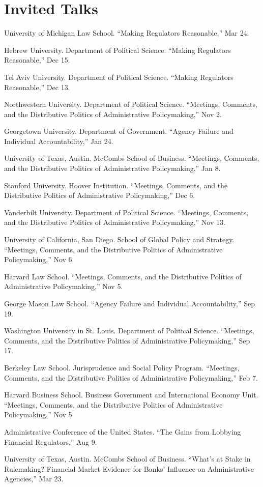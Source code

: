 \documentclass[12pt,letterpaper]{report}
\newcommand{\talk}[4]{\item[#1]{\tab{}#3. \enquote{#2,} #4.}} %
\begin{document}
    \section*{Invited Talks}

    \begin{tablist}
	\talk{2022}{Making Regulators Reasonable}{University of Michigan Law School}{Mar 24}
	
    \talk{2021}{Making Regulators Reasonable}{Hebrew University. Department of Political Science}{Dec 15}
    	
	\talk{2021}{Making Regulators Reasonable}{Tel Aviv University. Department of Political Science}{Dec 13}
			
	\talk{2021}{Meetings, Comments, and the Distributive Politics of Administrative Policymaking}{Northwestern University. Department of Political Science}{Nov 2}
		
    \talk{2020}{Agency Failure and Individual Accountability}{Georgetown University. Department of Government}{Jan 24}
    \talk{2020}{Meetings, Comments, and the Distributive Politics of Administrative Policymaking}{University of Texas, Austin. McCombs School of Business}{Jan 8}
    \talk{2019}{Meetings, Comments, and the Distributive Politics of Administrative Policymaking}{Stanford University. Hoover Institution}{Dec 6}
    \talk{2019}{Meetings, Comments, and the Distributive Politics of Administrative Policymaking}{Vanderbilt University. Department of Political Science}{Nov 13}
    \talk{2019}{Meetings, Comments, and the Distributive Politics of Administrative Policymaking}{University of California, San Diego. School of Global Policy and Strategy}{Nov 6}
    \talk{2019}{Meetings, Comments, and the Distributive Politics of Administrative Policymaking}{Harvard Law School}{Nov 5}    
    \talk{2019}{Agency Failure and Individual Accountability}{George Mason Law School}{Sep 19}
    \talk{2019}{Meetings, Comments, and the Distributive Politics of Administrative Policymaking}{Washington University in St. Louis. Department of Political Science}{Sep 17}    
    \talk{2019}{Meetings, Comments, and the Distributive Politics of Administrative Policymaking}{Berkeley Law School. Jurisprudence and Social Policy Program}{Feb 7}    
    \talk{2019}{Meetings, Comments, and the Distributive Politics of Administrative Policymaking}{Harvard Business School. Business Government and International Economy Unit}{Nov 5}   
    \talk{2019}{The Gains from Lobbying Financial Regulators}{Administrative Conference of the United States}{Aug 9}    
    \talk{2018}{What’s at Stake in Rulemaking? Financial Market Evidence for Banks’ Influence on Administrative Agencies}{University of Texas, Austin. McCombs School of Business}{Mar 23}
    
    \end{tablist}
\end{document}
